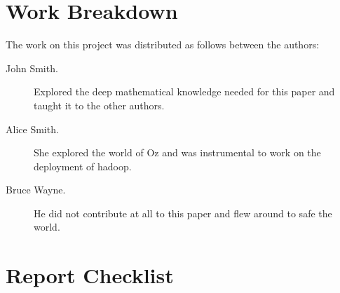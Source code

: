 \documentclass[9pt,twocolumn,twoside]{styles/osajnl}
\begin{document}


 

\appendix


\section{Work Breakdown}

The work on this project was distributed as follows between the
authors:

\begin{description}

\item[John Smith.] Explored the deep mathematical knowledge needed for
  this paper and taught it to the other authors.

\item[Alice Smith.] She explored the world of Oz and was instrumental
  to work on the deployment of hadoop.

\item[Bruce Wayne.] He did not contribute at all to this paper and
  flew around to safe the world.  

\end{description}

\section{Report Checklist}
\end{document}
